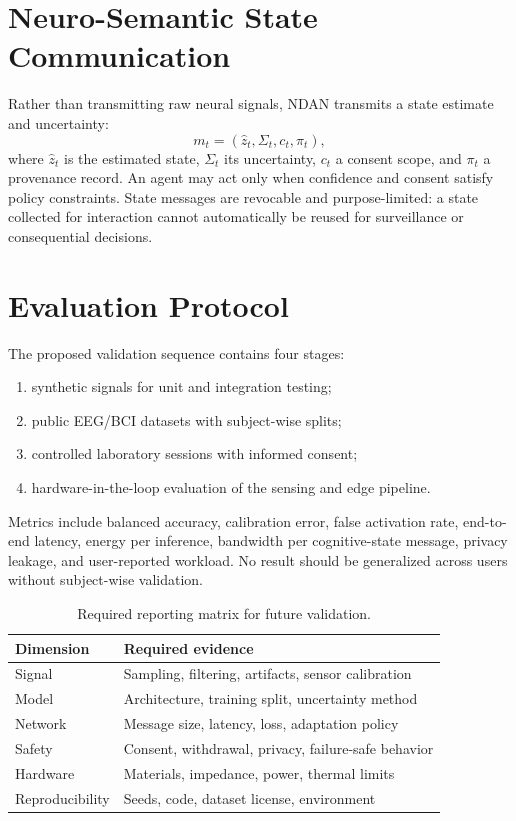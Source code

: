 \documentclass[sigconf]{acmart}
\begin{document}
\section{Neuro-Semantic State Communication}
Rather than transmitting raw neural signals, NDAN transmits a state estimate and uncertainty:
\begin{equation}
 m_t = (\hat{z}_t, \Sigma_t, c_t, \pi_t),
\end{equation}
where $\hat{z}_t$ is the estimated state, $\Sigma_t$ its uncertainty, $c_t$ a consent scope, and $\pi_t$ a provenance record. An agent may act only when confidence and consent satisfy policy constraints. State messages are revocable and purpose-limited: a state collected for interaction cannot automatically be reused for surveillance or consequential decisions.

\section{Evaluation Protocol}
The proposed validation sequence contains four stages:
\begin{enumerate}
\item synthetic signals for unit and integration testing;
\item public EEG/BCI datasets with subject-wise splits;
\item controlled laboratory sessions with informed consent;
\item hardware-in-the-loop evaluation of the sensing and edge pipeline.
\end{enumerate}
Metrics include balanced accuracy, calibration error, false activation rate, end-to-end latency, energy per inference, bandwidth per cognitive-state message, privacy leakage, and user-reported workload. No result should be generalized across users without subject-wise validation.

\begin{table}[h]
\centering
\caption{Required reporting matrix for future validation.}
\begin{tabular}{ll}
\toprule
Dimension & Required evidence \\
\midrule
Signal & Sampling, filtering, artifacts, sensor calibration \\
Model & Architecture, training split, uncertainty method \\
Network & Message size, latency, loss, adaptation policy \\
Safety & Consent, withdrawal, privacy, failure-safe behavior \\
Hardware & Materials, impedance, power, thermal limits \\
Reproducibility & Seeds, code, dataset license, environment \\
\bottomrule
\end{tabular}
\end{table}
\end{document}

